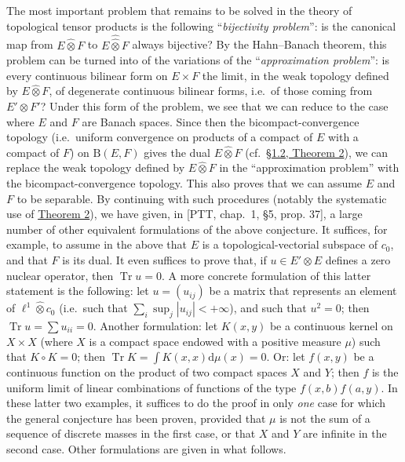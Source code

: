 \documentclass[british]{article}
\newcommand{\oldpage}[1]{\marginpar{\footnotesize$\Big\vert$ \textit{p.~#1}}}
\begin{document}
The most important problem that remains to be solved in the theory of
topological tensor products is the following ``\emph{bijectivity
problem}'': \oldpage{95} is the canonical map from \(E\hat{\otimes}F\)
to \(E\hat{\hat{\otimes}}F\) always bijective? By the Hahn--Banach
theorem, this problem can be turned into of the variations of the
``\emph{approximation problem}'': is every continuous bilinear form on
\(E\times F\) the limit, in the weak topology defined by
\(E\hat{\otimes}F\), of degenerate continuous bilinear forms, i.e.~of
those coming from \(E'\otimes F'\)? Under this form of the problem, we
see that we can reduce to the case where \(E\) and \(F\) are Banach
spaces. Since then the bicompact-convergence topology (i.e.~uniform
convergence on products of a compact of \(E\) with a compact of \(F\))
on \(\mathrm{B}(E,F)\) gives the dual \(E\hat{\otimes}F\)
(cf.~\hyperref[section-1-theorem-2]{§1.2, Theorem 2}), we can replace
the weak topology defined by \(E\hat{\otimes}F\) in the ``approximation
problem'' with the bicompact-convergence topology. This also proves that
we can assume \(E\) and \(F\) to be separable. By continuing with such
procedures (notably the systematic use of
\hyperref[section-1-theorem-2]{Theorem 2}), we have given, in {[}PTT,
chap.~1, §5, prop. 37{]}, a large number of other equivalent
formulations of the above conjecture. It suffices, for example, to
assume in the above that \(E\) is a topological-vectorial subspace of
\(c_0\), and that \(F\) is its dual. It even suffices to prove that, if
\(u\in E'\hat{\otimes}E\) defines a zero nuclear operator, then
\(\operatorname{Tr}u=0\). A more concrete formulation of this latter
statement is the following: let \(u=(u_{ij})\) be a matrix that
represents an element of \(\ell^1\hat{\otimes}c_0\) (i.e.~such that
\(\sum_i\sup_j|u_{ij}|<+\infty\)), and such that \(u^2=0\); then
\(\operatorname{Tr}u=\sum u_{ii}=0\). Another formulation: let
\(K(x,y)\) be a continuous kernel on \(X\times X\) (where \(X\) is a
compact space endowed with a positive measure \(\mu\)) such that
\(K\circ K=0\); then
\(\operatorname{Tr}K=\int K(x,x)\mathrm{d}\mu(x)=0\). Or: let \(f(x,y)\)
be a continuous function on the product of two compact spaces \(X\) and
\(Y\); then \(f\) is the uniform limit of linear combinations of
functions of the type \(f(x,b)f(a,y)\). In these latter two examples, it
suffices to do the proof in only \emph{one} case for which the general
conjecture has been proven, provided that \(\mu\) is not the sum of a
sequence of discrete masses in the first case, or that \(X\) and \(Y\)
are infinite in the second case. Other formulations are given in what
follows.
\end{document}
